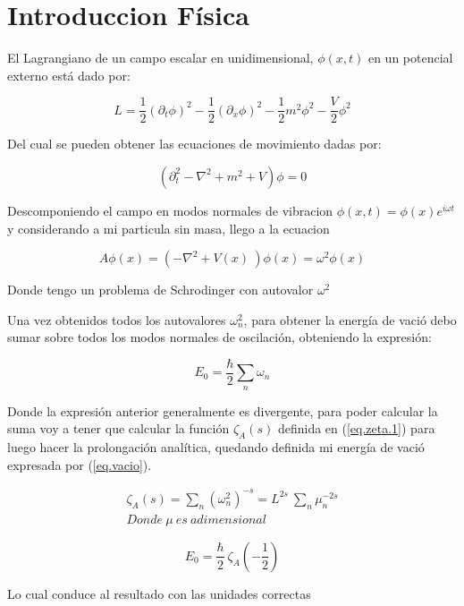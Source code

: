 \chapter{Introduccion Física}

El Lagrangiano de un campo escalar en unidimensional, $\phi (x,t)$ en un potencial externo está dado por:

\begin{equation}
    L = \frac{1}{2} (\partial _t \phi  ) ^2
    - \frac{1}{2} (\partial _x \phi ) ^2 - 
    \frac{1}{2} m ^2 \phi ^2  - \frac{V}{2} \phi ^2 
\end{equation}

Del cual se pueden obtener las ecuaciones de movimiento dadas por:


\begin{equation}
    ( \partial _t ^2 - \nabla ^2 + m ^2 +V  ) 
    \phi = 0
\end{equation}

Descomponiendo el campo en modos normales de vibracion  $\phi (x,t) = \phi(x) e ^{i \omega t}$ y considerando a mi particula sin masa, llego a la ecuacion

\begin{equation}
   A \phi(x) =  ( - \nabla ^2 + V(x) \ ) \phi (x) = \omega ^2 \phi (x)  
\end{equation}


Donde tengo un problema de Schrodinger con autovalor $\omega  ^2$

Una vez obtenidos todos los autovalores $\omega ^2 _n $, para obtener la energía de vació debo sumar sobre todos los modos normales de oscilación, obteniendo la expresión: 

\begin{equation}
    E _0 = 
    \frac{\hbar}{2}  \sum _n \omega _n 
\label{eq.vacio}
\end{equation}

Donde la expresión anterior generalmente es divergente, para poder calcular la suma voy a tener que calcular la función $\zeta _A (s) $ definida en (\ref{eq.zeta.1}) para luego hacer la prolongación analítica, quedando definida mi energía de vació expresada por (\ref{eq.vacio}).  


\begin{equation}
\begin{array}{c}
    \zeta _A (s) = \sum _n ( \omega _n ^{2} ) ^{-s} = 
    L ^{2 s} \ \sum _n  \mu _n ^{-2 s}  \\
    Donde \ \mu \ es \ adimensional
\end{array}
\label{eq.zeta.1}
\end{equation}

\begin{equation}
    E _0 = \frac{\hbar}{2}  \ \zeta _A (-\frac{1}{2})
\label{eq.vacio}
\end{equation}

Lo cual conduce al resultado con las unidades correctas




















